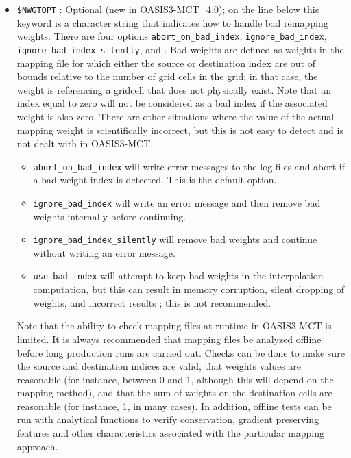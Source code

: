 \begin{itemize}
\item {\tt \$NWGTOPT} : Optional (new in OASIS3-MCT\_4.0); on the line below this keyword is a character string
  that indicates how to handle bad remapping weights.  There are four options \newline
  {\tt abort\_on\_bad\_index}, {\tt ignore\_bad\_index}, {\tt ignore\_bad\_index\_silently}, and
 .  Bad weights are defined as weights in the mapping file for which either 
  the source or destination index are out of bounds relative to the number of grid cells
  in the grid; in that case, the weight is referencing a gridcell that does not physically
  exist.  Note that an index equal to zero will not be considered as a bad index if the associated weight 
  is also zero. There are other situations where the value of the actual mapping weight is 
  scientifically incorrect, but this is not easy to detect and is not dealt with in OASIS3-MCT.
  \begin{itemize}
  \item {\tt abort\_on\_bad\_index} will write error messages to the log files and abort if a bad weight
  index is detected. This is the default option. 
  \item {\tt ignore\_bad\_index} will write an error message and then remove bad
  weights internally before continuing.  
  \item {\tt ignore\_bad\_index\_silently} will remove bad weights and continue without writing an error
  message.  
  \item {\tt use\_bad\_index} will attempt to keep bad weights in the interpolation computation, 
  but this can result in memory corruption, silent dropping of weights, and incorrect results ; this is not recommended. 
  \end{itemize} 

  Note that the ability to check mapping files at runtime in OASIS3-MCT is limited.  It is always
  recommended that mapping files be analyzed offline before long production runs are carried out.
  Checks can be done to make sure the source and destination indices are valid, that weights values
  are reasonable (for instance, between 0 and 1, although this will depend on the mapping method),
  and that the sum of weights on the destination cells are reasonable (for instance, 1, in many cases).
  In addition, offline tests can be run with analytical functions to verify conservation, gradient 
  preserving features and other characteristics associated with the particular mapping approach.


\end{itemize}
